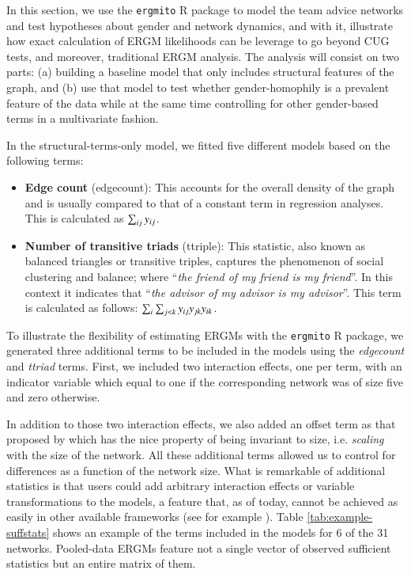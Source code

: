 \documentclass[review, nonatbib,doubleblind]{elsarticle/elsarticle}
\begin{document}
In this section, we use the \texttt{ergmito} R package to model the team advice networks and test hypotheses about gender and network dynamics, and with it, illustrate how exact calculation of ERGM likelihoods can be leverage to go beyond CUG tests, and moreover, traditional ERGM analysis. The analysis will consist on two parts: (a) building a baseline model that only includes structural features of the graph, and (b) use that model to test whether gender-homophily is a prevalent feature of the data while at the same time controlling for other gender-based terms in a multivariate fashion.

In the structural-terms-only model, we fitted five different models based on the following terms:

\begin{itemize}
    \item \textbf{Edge count} (edgecount): This accounts for the overall density of the graph and is usually compared to that of a constant term in regression analyses. This is calculated as $\sum_{ij}y_{ij}$.
    \item \textbf{Number of transitive triads} (ttriple): This statistic, also known as balanced triangles or transitive triples, captures the phenomenon of social clustering and balance; where ``\textit{the friend of my friend is my friend}''. In this context it indicates that ``\textit{the advisor of my advisor is my advisor}''. This term is calculated as follows: $\sum_{i}\sum_{j<k}y_{ij}y_{jk}y_{ik}$.
\end{itemize}

To illustrate the flexibility of estimating ERGMs with the \texttt{ergmito} R package, we generated three additional terms to be included in the models using the \textit{edgecount} and \textit{ttriad} terms. First, we included two interaction effects, one per term, with an indicator variable which equal to one if the corresponding network was of size five and zero otherwise.

In addition to those two interaction effects, we also added an offset term as that proposed by \cite{Krivitsky2011} which has the nice property of being invariant to size, i.e. \textit{scaling} with the size of the network. All these additional terms allowed us to control for differences as a function of the network size. What is remarkable of additional statistics is that users could add arbitrary interaction effects or variable transformations to the models, a feature that, as of today, cannot be achieved as easily in other available frameworks (see for example \cite{Hunter2013,Handcock2019}). Table \ref{tab:example-suffstats} shows an example of the terms included in the models for 6 of the 31 networks. Pooled-data ERGMs feature not a single vector of observed sufficient statistics but an entire matrix of them.
\end{document}
